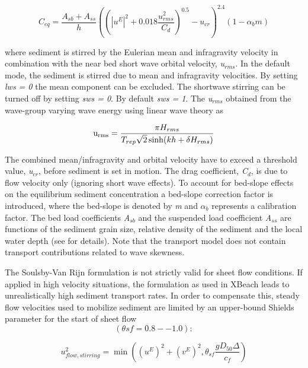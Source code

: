 \begin{equation} \label{2.62)} 
C_{eq} =\frac{A_{sb} +A_{ss} }{h} \left(\left(|u^{E} |^{2} +0.018\frac{u_{rms}^{2} }{C_{d} } \right)^{0.5} -u_{cr} \right)^{2.4} (1-\alpha _{b} m) 
\end{equation} 

where sediment is stirred by the Eulerian mean and infragravity velocity in combination with the near bed short wave orbital velocity, \textit{u${}_{rms}$}. In the default mode, the sediment is stirred due to mean and infragravity velocities. By setting \textit{lws = 0} the mean component can be excluded. The shortwave stirring can be turned off by setting \textit{sws = 0}. By default \textit{sws = 1}. The \textit{u${}_{rms}$} obtained from the wave-group varying wave energy using linear wave theory as

\begin{equation} \label{2.63)} 
{\rm u}_{{\rm rms}} =\frac{\pi H_{rms} }{T_{rep} \sqrt{2} \sinh (kh+\delta H_{rms} )}  
\end{equation} 

The combined mean/infragravity and orbital velocity have to exceed a threshold value, \textit{u${}_{cr}$}, before sediment is set in motion. The drag coefficient, \textit{C${}_{d}$}, is due to flow velocity only (ignoring short wave effects). To account for bed-slope effects on the equilibrium sediment concentration a bed-slope correction factor is introduced, where the bed-slope is denoted by \textit{m} and $\alpha _{b} $ represents a calibration factor. The bed load coefficients \textit{A${}_{sb}$ }and the suspended load coefficient \textit{A${}_{ss}$} are functions of the sediment grain size, relative density of the sediment and the local water depth (see \citet{Soulsby1997} for details). Note that the transport model does not contain transport contributions related to wave skewness.

The Soulsby-Van Rijn formulation is not strictly valid for sheet flow conditions. If applied in high velocity situations, the formulation as used in XBeach leads to unrealistically high sediment transport rates. In order to compensate this, steady flow velocities used to mobilize sediment are limited by an upper-bound Shields parameter for the start of sheet flow 
\[(\theta sf = 0.8 -- 1.0):\] 

\begin{equation} \label{2.64)} 
u_{flow,stirring}^{2} =\min \left(\left(u^{E} \right)^{2} +\left(v^{E} \right)^{2} ,\theta _{sf} \frac{gD_{50} \Delta }{c_{f} } \right) 
\end{equation} 

